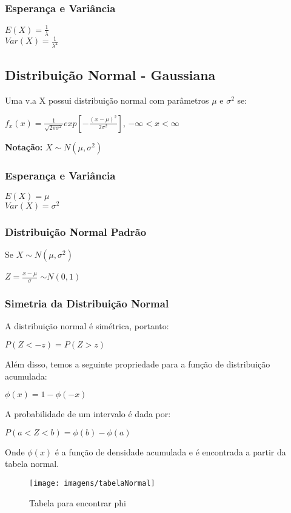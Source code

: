 \documentclass[a4paper, 12pt]{article}
\begin{document}
\subsubsection{Esperança e Variância}
	\begin{center}
		\Large
		$
		E(X) = \frac{1}{\lambda}
		$\\
		$Var(X) = \frac{1}{\lambda ^2}$
	\end{center}

\subsection{Distribuição Normal - Gaussiana}	
	Uma v.a X possui distribuição normal com parâmetros $\mu$ e $\sigma ^2$ se:
	\begin{center}
		\Large	
		$
		f_{x}(x) = \frac{1}{\sqrt{2\pi \sigma ^2}}exp[-\frac{(x-\mu)^2}{2\sigma ^2}]
		$, $
		-\infty<x<\infty
		$
	\end{center}
	\textbf{Notação:} $X \sim N(\mu, \sigma^2)$

\subsubsection{Esperança e Variância}
	\begin{center}
		\Large
		$
		E(X) = \mu
		$\\
		$
		Var(X) = \sigma^2
		$
	\end{center}

\subsubsection{Distribuição Normal Padrão}
	Se $X \sim N(\mu, \sigma^2)$\\
	\begin{center}
		\Large
		$
		Z = \frac{x-\mu}{\sigma}
		$ $\sim N(0,1)$
	\end{center}
	
\subsubsection{Simetria da Distribuição Normal}
	A distribuição normal é simétrica, portanto:
	\begin{center}
		\Large
		$
		P(Z < -z) = P(Z > z)
		$
	\end{center}
	Além disso, temos a seguinte propriedade para a função de distribuição acumulada:
	\begin{center}
		\Large
		$
		\phi (x) = 1 - \phi (-x)
		$
	\end{center}
 	A probabilidade de um intervalo é dada por:
 	\begin{center}
 		\Large
 		$
 		P(a<Z<b) = \phi (b) - \phi (a)
 		$
 	\end{center}
	Onde $\phi (x)$ é a função de densidade acumulada e é encontrada a partir da tabela normal.
	\begin{figure}[h]
		\centering
		\texttt{[image: imagens/tabelaNormal]}
		\caption{Tabela para encontrar phi}
		\label{fig:tabelanormal}
	\end{figure}
	
\end{document}
